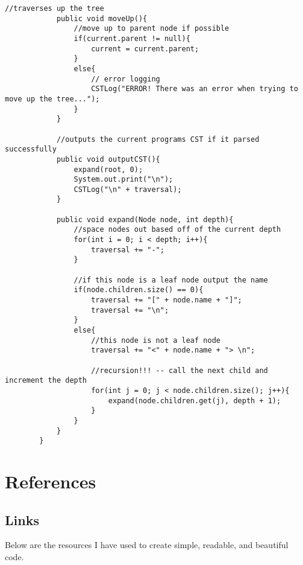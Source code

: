 \documentclass[letterpaper, 10pt,DIV=13]{scrartcl}
\numberwithin{equation}{section} %
\numberwithin{figure}{section} %
\numberwithin{table}{section} %
\begin{document}
\begin{lstlisting}[frame=single, ]
            //traverses up the tree
            public void moveUp(){
                //move up to parent node if possible
                if(current.parent != null){
                    current = current.parent;
                }
                else{
                    // error logging
                    CSTLog("ERROR! There was an error when trying to move up the tree...");
                }
            }
        
            //outputs the current programs CST if it parsed successfully
            public void outputCST(){
                expand(root, 0);
                System.out.print("\n");
                CSTLog("\n" + traversal);
            }
        
            public void expand(Node node, int depth){
                //space nodes out based off of the current depth
                for(int i = 0; i < depth; i++){
                    traversal += "-";
                }
        
                //if this node is a leaf node output the name
                if(node.children.size() == 0){
                    traversal += "[" + node.name + "]";
                    traversal += "\n";
                }
                else{
                    //this node is not a leaf node
                    traversal += "<" + node.name + "> \n";
        
                    //recursion!!! -- call the next child and increment the depth
                    for(int j = 0; j < node.children.size(); j++){
                        expand(node.children.get(j), depth + 1);
                    }
                }
            }
        }
    \end{lstlisting}

\pagebreak

\section{References}

\subsection{Links}
Below are the resources I have used to create simple, readable, and beautiful code.
\end{document}
